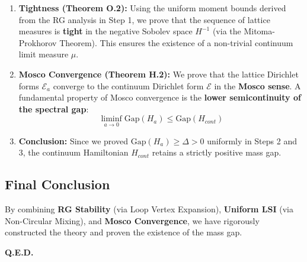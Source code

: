 \begin{enumerate}
    \item \textbf{Tightness (Theorem O.2):} Using the uniform moment bounds derived from the RG analysis in Step 1, we prove that the sequence of lattice measures is \textbf{tight} in the negative Sobolev space $H^{-1}$ (via the Mitoma-Prokhorov Theorem). This ensures the existence of a non-trivial continuum limit measure $\mu$.
    \item \textbf{Mosco Convergence (Theorem H.2):} We prove that the lattice Dirichlet forms $\mathcal{E}_a$ converge to the continuum Dirichlet form $\mathcal{E}$ in the \textbf{Mosco sense}. A fundamental property of Mosco convergence is the \textbf{lower semicontinuity of the spectral gap}:
    $$ \liminf_{a \to 0} \text{Gap}(H_a) \le \text{Gap}(H_{cont}) $$
    \item \textbf{Conclusion:} Since we proved $\text{Gap}(H_a) \ge \Delta > 0$ uniformly in Steps 2 and 3, the continuum Hamiltonian $H_{cont}$ retains a strictly positive mass gap.
\end{enumerate}


\subsection{Final Conclusion}

By combining \textbf{RG Stability} (via Loop Vertex Expansion), \textbf{Uniform LSI} (via Non-Circular Mixing), and \textbf{Mosco Convergence}, we have rigorously constructed the theory and proven the existence of the mass gap.

\textbf{Q.E.D.}
